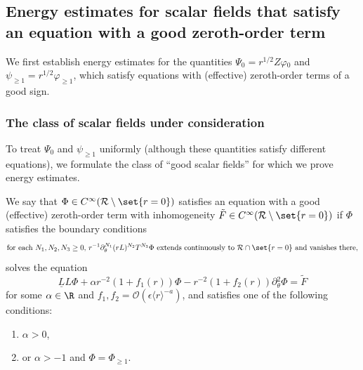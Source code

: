 \documentclass[10pt, reqno]{amsart}
\begin{document}
\subsection{Energy estimates for scalar fields that satisfy an equation with a good zeroth-order term}
\label{good-scalar-field-energy-estimates}
We first establish energy estimates for the quantities \(\Psi{}_0 =
r^{1/2}Z\varphi{}_0\) and \(\psi_{\ge 1} = r^{1/2}\varphi_{\ge 1}\), which
satisfy equations with (effective) zeroth-order terms of a good sign.
\subsubsection{The class of scalar fields under consideration}
\label{class-of-fields}
To treat \(\Psi_0\) and \(\psi_{\ge 1}\) uniformly (although these quantities satisfy
different equations), we formulate the class of ``good scalar fields'' for which
we prove energy estimates.
\begin{definition}
We say that \(\Phi{}\in C^\infty(\mathcal{R}\setminus \set{r=0})\) satisfies an equation with a good
(effective) zeroth-order term with inhomogeneity \(\tilde{F}\in C^\infty(\mathcal{R}\setminus \set{r=0})\) if \(\Phi{}\) satisfies the boundary conditions
\begin{equation}\label{bdy-conditions-rp}
\begin{gathered}
\textnormal{for each }N_1,N_2,N_3\ge 0,\,r^{-1}\partial_\theta^{N_1}(rL)^{N_2}T^{N_3}\Phi{}\textnormal{ extends continuously to }\mathcal{R}\cap \set{r=0}\textnormal{ and vanishes there},
\end{gathered}
\end{equation}
solves the equation
\begin{equation}\label{alpha-equation}
\underline{L}L\Phi{} + \alpha{}r^{-2}(1 + f_1(r))\Phi{} - r^{-2}(1 + f_2(r))\partial{}_\theta^2\Phi{} = \tilde{F}
\end{equation}
for some \(\alpha{}\in \R\) and \(f_1,f_2=\mathcal{O}(\epsilon{}\langle{}r\rangle^{-a})\), and satisfies one of the
following conditions:
\begin{enumerate}
\item \label{alpha-big} \(\alpha{} > 0\),
\item \label{angular-big} or \(\alpha{} > -1\) and \(\Phi{} = \Phi{}_{\ge 1}\).
\end{enumerate}
\label{good-field}
\end{definition}
\end{document}
